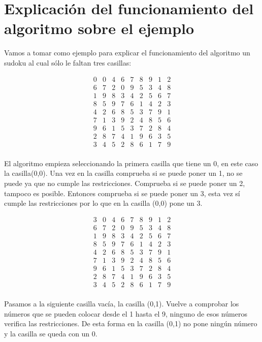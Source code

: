 \documentclass[11pt, a4paper]{article}
\theoremstyle{theorem-style}
\theoremstyle{definition-style}
\theoremstyle{remark-style}
\theoremstyle{example-style}
\begin{document}
\section{Explicación del funcionamiento del algoritmo sobre el ejemplo}

Vamos a tomar como ejemplo para explicar el funcionamiento del algoritmo un sudoku al cual sólo le faltan tres casillas:

\[
\begin{array}{ccccccccc}
0 & 0 & 4 & 6 & 7 & 8 & 9 & 1 & 2\\
6 & 7 & 2 & 0 & 9 & 5 & 3 & 4 & 8\\
1 & 9 & 8 & 3 & 4 & 2 & 5 & 6 & 7\\
8 & 5 & 9 & 7 & 6 & 1 & 4 & 2 & 3\\
4 & 2 & 6 & 8 & 5 & 3 & 7 & 9 & 1\\
7 & 1 & 3 & 9 & 2 & 4 & 8 & 5 & 6\\
9 & 6 & 1 & 5 & 3 & 7 & 2 & 8 & 4\\
2 & 8 & 7 & 4 & 1 & 9 & 6 & 3 & 5\\
3 & 4 & 5 & 2 & 8 & 6 & 1 & 7 & 9\\
\end{array}
\]

El algoritmo empieza seleccionando la primera casilla que tiene un 0, en este caso la casilla(0,0).
Una vez en la casilla comprueba si se puede poner un 1, no se puede ya que no cumple las restricciones. Comprueba si se puede poner un 2, tampoco es posible. Entonces comprueba si se puede poner un 3, esta vez sí cumple las restricciones por lo que en la casilla (0,0) pone un 3.

\[
\begin{array}{ccccccccc}
3 & 0 & 4 & 6 & 7 & 8 & 9 & 1 & 2\\
6 & 7 & 2 & 0 & 9 & 5 & 3 & 4 & 8\\
1 & 9 & 8 & 3 & 4 & 2 & 5 & 6 & 7\\
8 & 5 & 9 & 7 & 6 & 1 & 4 & 2 & 3\\
4 & 2 & 6 & 8 & 5 & 3 & 7 & 9 & 1\\
7 & 1 & 3 & 9 & 2 & 4 & 8 & 5 & 6\\
9 & 6 & 1 & 5 & 3 & 7 & 2 & 8 & 4\\
2 & 8 & 7 & 4 & 1 & 9 & 6 & 3 & 5\\
3 & 4 & 5 & 2 & 8 & 6 & 1 & 7 & 9\\
\end{array}
\]

Pasamos a la siguiente casilla vacía, la casilla (0,1). Vuelve a comprobar los números que se pueden colocar desde el 1 hasta el 9, ninguno de esos números verifica las restricciones. De esta forma en la casilla (0,1) no pone ningún número y la casilla se queda con un 0.
\end{document}
